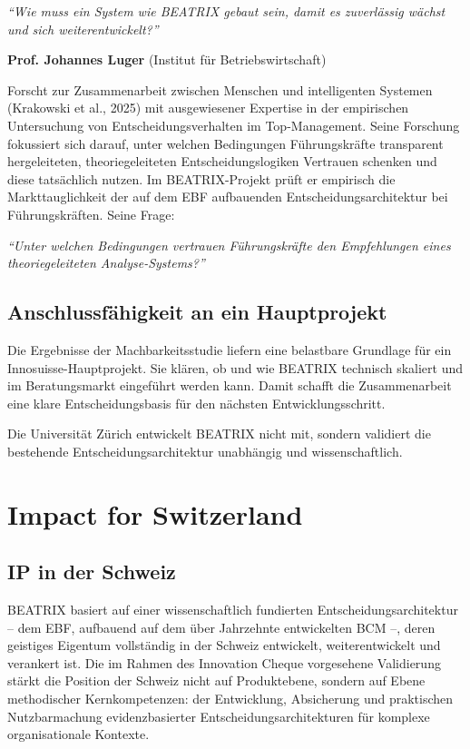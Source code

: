 \documentclass[11pt,a4paper]{article}
\begin{document}
\textit{``Wie muss ein System wie BEATRIX gebaut sein, damit es zuverlässig wächst und sich weiterentwickelt?''}

\textbf{Prof. Johannes Luger} (Institut für Betriebswirtschaft)

Forscht zur Zusammenarbeit zwischen Menschen und intelligenten Systemen (Krakowski et al., 2025) mit ausgewiesener Expertise in der empirischen Untersuchung von Entscheidungsverhalten im Top-Management. Seine Forschung fokussiert sich darauf, unter welchen Bedingungen Führungskräfte transparent hergeleiteten, theoriegeleiteten Entscheidungslogiken Vertrauen schenken und diese tatsächlich nutzen. Im BEATRIX-Projekt prüft er empirisch die Markttauglichkeit der auf dem EBF aufbauenden Entscheidungsarchitektur bei Führungskräften. Seine Frage:

\textit{``Unter welchen Bedingungen vertrauen Führungskräfte den Empfehlungen eines theoriegeleiteten Analyse-Systems?''}

\subsection{Anschlussfähigkeit an ein Hauptprojekt}

Die Ergebnisse der Machbarkeitsstudie liefern eine belastbare Grundlage für ein Innosuisse-Hauptprojekt. Sie klären, ob und wie BEATRIX technisch skaliert und im Beratungsmarkt eingeführt werden kann. Damit schafft die Zusammenarbeit eine klare Entscheidungsbasis für den nächsten Entwicklungsschritt.

Die Universität Zürich entwickelt BEATRIX nicht mit, sondern validiert die bestehende Entscheidungsarchitektur unabhängig und wissenschaftlich.

\newpage


\section{Impact for Switzerland}

\subsection{IP in der Schweiz}

BEATRIX basiert auf einer wissenschaftlich fundierten Entscheidungsarchitektur -- dem EBF, aufbauend auf dem über Jahrzehnte entwickelten BCM --, deren geistiges Eigentum vollständig in der Schweiz entwickelt, weiterentwickelt und verankert ist. Die im Rahmen des Innovation Cheque vorgesehene Validierung stärkt die Position der Schweiz nicht auf Produktebene, sondern auf Ebene methodischer Kernkompetenzen: der Entwicklung, Absicherung und praktischen Nutzbarmachung evidenzbasierter Entscheidungsarchitekturen für komplexe organisationale Kontexte.
\end{document}
